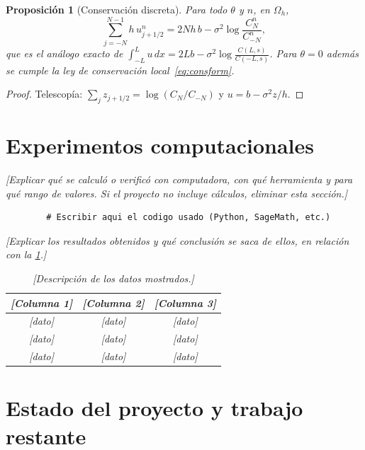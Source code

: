 \documentclass[11pt,letterpaper]{article}
\theoremstyle{plain}
\newtheorem{proposicion}[theorem]{Proposición}
\theoremstyle{definition}
\theoremstyle{remark}
\numberwithin{equation}{section}
\newcommand{\ph}[1]{\textcolor{red!70!black}{\textit{[#1]}}}
\begin{document}
	\begin{proposicion}[Conservación discreta]\label{prop:cons}
		Para todo \(\theta\) y \(n\), en \(\Omega_h\),
		\[
		\sum_{j=-N}^{N-1}h\,u^n_{j+1/2}=2Nh\,b-\sigma^2\log\frac{C^n_N}{C^n_{-N}},
		\]
		que es el análogo exacto de \(\int_{-L}^Lu\,dx=2Lb-\sigma^2\log\frac{C(L,s)}{C(-L,s)}\). Para \(\theta=0\) además se cumple la ley de conservación local~\eqref{eq:consform}.
	\end{proposicion}
	
	\begin{proof}
		Telescopía: \(\sum_jz_{j+1/2}=\log(C_N/C_{-N})\) y \(u=b-\sigma^2z/h\).
	\end{proof}
	
	\section{Experimentos computacionales}\label{sec:experimentos}
	
	\ph{Explicar qué se calculó o verificó con computadora, con qué herramienta y para qué rango de valores. Si el proyecto no incluye cálculos, eliminar esta sección.}
	
	\begin{lstlisting}
		# Escribir aqui el codigo usado (Python, SageMath, etc.)
	\end{lstlisting}
	
	\ph{Explicar los resultados obtenidos y qué conclusión se saca de ellos, en relación con la \cref{tab:resultados}.}
	
	\begin{table}[ht]
		\centering
		\renewcommand{\arraystretch}{1.2}
		\begin{tabular}{@{}ccc@{}}
			\toprule
			\ph{Columna 1} & \ph{Columna 2} & \ph{Columna 3} \\
			\midrule
			\ph{dato} & \ph{dato} & \ph{dato} \\
			\ph{dato} & \ph{dato} & \ph{dato} \\
			\ph{dato} & \ph{dato} & \ph{dato} \\
			\bottomrule
		\end{tabular}
		\caption{\ph{Descripción de los datos mostrados.}}\label{tab:resultados}
	\end{table}
	
	\section{Estado del proyecto y trabajo restante}\label{sec:estado}
	
\end{document}

